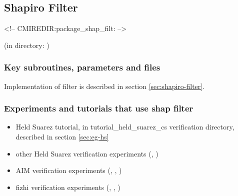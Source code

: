 \subsection{Shapiro Filter}
\label{sec:shap_filt}
\begin{rawhtml}
<!-- CMIREDIR:package_shap_filt: -->
\end{rawhtml}
\begin{center}
(in directory: )
\end{center}

\subsubsection{Key subroutines, parameters and files}
Implementation of \cite{Shapiro_70} filter is described in
section \ref{sec:shapiro-filter}.



\subsubsection{Experiments and tutorials that use shap filter}
\label{sec:pkg:shap_filt:experiments}

\begin{itemize}
\item Held Suarez tutorial, in tutorial\_held\_suarez\_cs verification directory, described in 
section \ref{sec:eg-hs}
\item other Held Suarez verification experiments (, 
      )
\item AIM verification experiments (, 
       , )
\item fizhi verification experiments (, 
       , )

\end{itemize}

